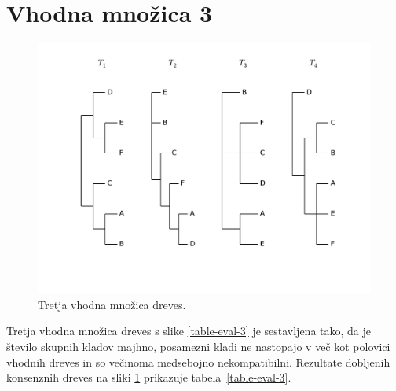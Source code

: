 \documentclass[a4paper, 12pt]{book}
\begin{document}
\section{Vhodna množica 3}
\begin{figure}[h!]
	\begin{center}
		\includegraphics[scale=0.62, clip=true, trim=0 2cm 0 0.5cm]{gfx/eval_input_3.pdf}
	\end{center}
	\caption{Tretja vhodna množica dreves.}
	\label{img-eval-input-3}
\end{figure}

\noindent Tretja vhodna množica dreves s slike \ref{table-eval-3} je sestavljena tako, 
da je število skupnih kladov majhno, posamezni kladi ne nastopajo v več kot 
polovici vhodnih dreves in so večinoma medsebojno nekompatibilni. Rezultate
dobljenih konsenznih dreves na sliki \ref{img-eval-input-3} prikazuje 
tabela~\ref{table-eval-3}.
\end{document}
